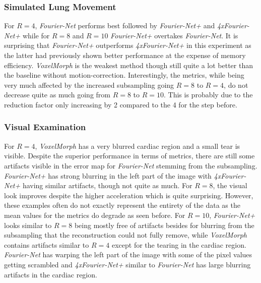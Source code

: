 \subsubsection{Simulated Lung Movement}
For $R=4$, \emph{Fourier-Net} performs best followed by \emph{Fourier-Net+} and \emph{4xFourier-Net+} while for $R=8$ and $R=10$ \emph{Fourier-Net+} overtakes \emph{Fourier-Net}. It is surprising that \emph{Fourier-Net+} outperforms \emph{4xFourier-Net+} in this experiment as the latter had previously shown better performance at the expense of memory efficiency. \emph{VoxelMorph} is the weakest method though still quite a lot better than the baseline without motion-correction. Interestingly, the metrics, while being very much affected by the increased subsampling going $R=8$ to $R=4$, do not decrease quite as much going from $R=8$ to $R=10$. This is probably due to the reduction factor only increasing by 2 compared to the 4 for the step before. 

\subsubsection{Visual Examination}
For $R=4$, \emph{VoxelMorph} has a very blurred cardiac region and a small tear is visible. Despite the superior performance in terms of metrics, there are still some artifacts visible in the error map for \emph{Fourier-Net} stemming from the subsampling. \emph{Fourier-Net+} has strong blurring in the left part of the image with \emph{4xFourier-Net+} having similar artifacts, though not quite as much. For $R=8$, the visual look improves despite the higher acceleration which is quite surprising. However, these examples often do not exactly represent the entirety of the data as the mean values for the metrics do degrade as seen before. For $R=10$, \emph{Fourier-Net+} looks similar to $R=8$ being mostly free of artifacts besides for blurring from the subsampling that the reconstruction could not fully remove, while \emph{VoxelMorph} contains artifacts similar to $R=4$ except for the tearing in the cardiac region. \emph{Fourier-Net} has warping the left part of the image with some of the pixel values getting scrambled and \emph{4xFourier-Net+} similar to \emph{Fourier-Net} has large blurring artifacts in the cardiac region.

